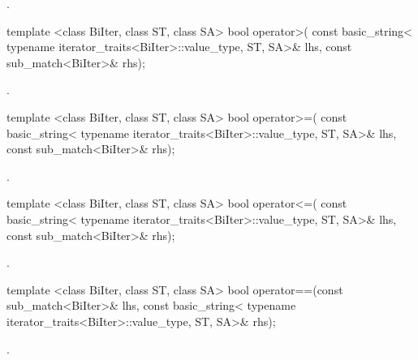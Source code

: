 \begin{itemdescr}
\pnum\returns {}.
\end{itemdescr}

%
\begin{itemdecl}
template <class BiIter, class ST, class SA>
  bool operator>(
    const basic_string<
      typename iterator_traits<BiIter>::value_type, ST, SA>& lhs,
    const sub_match<BiIter>& rhs);
\end{itemdecl}

\begin{itemdescr}
\pnum\returns {}.
\end{itemdescr}

%
\begin{itemdecl}
template <class BiIter, class ST, class SA>
  bool operator>=(
    const basic_string<
      typename iterator_traits<BiIter>::value_type, ST, SA>& lhs,
    const sub_match<BiIter>& rhs);
\end{itemdecl}

\begin{itemdescr}
\pnum\returns {}.
\end{itemdescr}

%
\begin{itemdecl}
template <class BiIter, class ST, class SA>
  bool operator<=(
    const basic_string<
      typename iterator_traits<BiIter>::value_type, ST, SA>& lhs,
    const sub_match<BiIter>& rhs);
\end{itemdecl}

\begin{itemdescr}
\pnum\returns {}.
\end{itemdescr}

%
\begin{itemdecl}
template <class BiIter, class ST, class SA>
  bool operator==(const sub_match<BiIter>& lhs,
                  const basic_string<
                    typename iterator_traits<BiIter>::value_type, ST, SA>& rhs);
\end{itemdecl}

\begin{itemdescr}
\pnum\returns {}.
\end{itemdescr}

